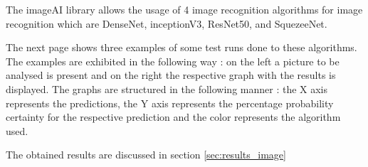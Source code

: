   The imageAI library allows the usage of 4 image recognition algorithms for image recognition which are DenseNet, inceptionV3, ResNet50, and SquezeeNet.

  The next page shows three examples of some test runs done to these algorithms. The examples are exhibited in the following way : on the left a  picture to be analysed is present and on the right the respective graph with the results is displayed. The graphs are structured in the following manner : the X axis represents the predictions, the Y axis represents the percentage probability certainty for the respective prediction and the color represents the algorithm used.

  The obtained results are discussed in section \ref{sec:results_image}





\newpage



